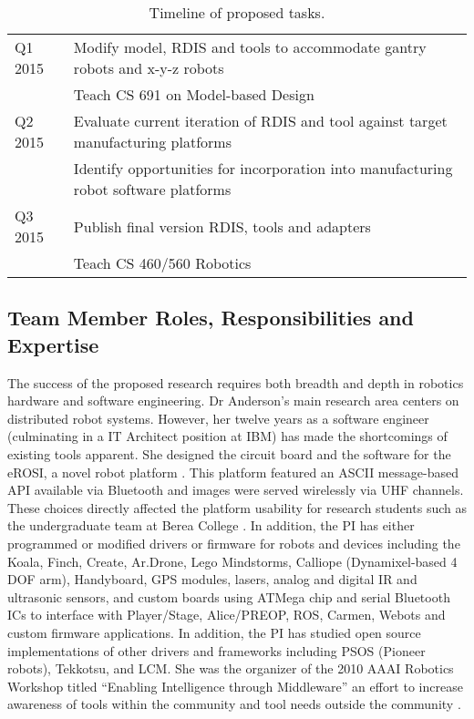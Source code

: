 \begin{table}[htbp]
\begin{tabular}{|l|l|}
      Q1 2015       & Modify model, RDIS and tools to accommodate gantry robots and x-y-z robots\\
						&Teach CS 691 on Model-based Design\\
      Q2 2015       & Evaluate current iteration of RDIS and tool against target manufacturing platforms\\
      			& Identify opportunities for incorporation into manufacturing robot software platforms\\
      Q3 2015       & Publish final version RDIS, tools and adapters\\
       &Teach CS 460/560 Robotics\\
      \hline
   \end{tabular}
   \caption{Timeline of proposed tasks.}
   \label{tab:tasks}
\end{table}

\subsection{Team Member Roles, Responsibilities and Expertise}

The success of the proposed research requires both breadth and depth in robotics hardware and software engineering.  Dr Anderson's main research area centers on distributed robot systems.  However, her twelve years as a software engineer (culminating in a IT Architect position at IBM) has made the shortcomings of existing tools apparent.  She designed the circuit board and the software for the eROSI, a novel robot platform \cite{walter2007design}.  This platform featured an ASCII message-based API available via Bluetooth and images were served wirelessly via UHF channels.  These choices directly affected the platform usability for research students such as the undergraduate team at Berea College \cite{Isaacs2006}.  In addition, the PI has either programmed or modified drivers or firmware for robots and devices including the Koala, Finch, Create, Ar.Drone, Lego Mindstorms, Calliope (Dynamixel-based 4 DOF arm), Handyboard, GPS modules, lasers, analog and digital IR and ultrasonic sensors, and custom boards using ATMega chip and serial Bluetooth ICs to interface with Player/Stage, Alice/PREOP, ROS, Carmen, Webots and custom firmware applications.  In addition, the PI has studied open source implementations of other drivers and frameworks including PSOS (Pioneer robots), Tekkotsu, and LCM.  She was the organizer of the 2010 AAAI Robotics Workshop titled ``Enabling Intelligence through Middleware'' an effort to increase awareness of tools within the community and tool needs outside the community \cite{MonicaAnderson2011}.

